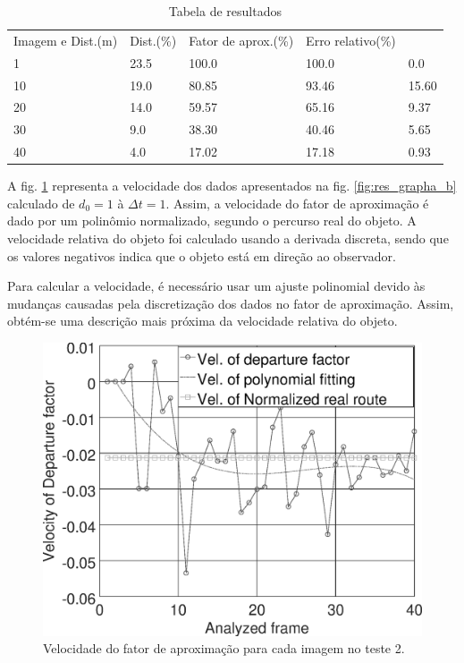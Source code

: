 \begin{table}[H]
\setlength{\tabcolsep}{1 pt} 
\caption{Tabela de resultados}
\begin{tabular}{lllll}
Imagem e Dist.(m) & Dist.(\%) & Fator de aprox.(\%) & Erro relativo(\%)\\
1 & 23.5 & 100.0 & 100.0 & 0.0 \\
10 & 19.0 & 80.85 & 93.46 & 15.60 \\
20 & 14.0 & 59.57 & 65.16 & 9.37 \\
30 & 9.0 & 38.30 & 40.46 & 5.65 \\
40 & 4.0 & 17.02 & 17.18 & 0.93
\end{tabular}
\label{tab:tab1}
\end{table}

A fig. \ref{fig:res_grapha_bv} representa a velocidade dos dados apresentados 
na fig. \ref{fig:res_grapha_b} calculado de $d_0=1$ à $\Delta t=1$.
Assim, a velocidade do fator de aproximação é dado por um polinômio
normalizado, segundo o percurso real do objeto.
A velocidade relativa do objeto foi calculado usando a derivada
discreta, sendo que os valores negativos indica que o objeto está
em direção ao observador.

Para calcular a velocidade, é necessário usar um ajuste polinomial devido 
às mudanças causadas pela discretização dos dados no fator de aproximação.
Assim, obtém-se uma descrição mais próxima da velocidade relativa do 
objeto.

\begin{figure}[H]
\includegraphics[width=\columnwidth]{images/graphvelocity.eps}
\caption{Velocidade do fator de aproximação para cada imagem no teste 2.}
\label{fig:res_grapha_bv}
\end{figure}